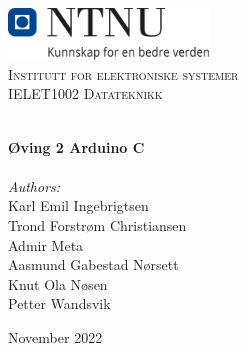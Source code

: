 
\begin{titlepage}
\vbox{ }
\vbox{ }
\begin{center}
\includegraphics[width=0.40\textwidth]{Images/NTNU_logo.png}\\[1cm]
\textsc{\LARGE Institutt for elektroniske systemer}\\[1.5cm]
\textsc{\Large IELET1002 Datateknikk}\\[0.5cm]
\vbox{ }

\HRule \\[0.4cm]
{ \huge \bfseries Øving 2 Arduino C}\\[0.4cm]
\HRule \\[1.5cm]

\large
\emph{Authors:}\\
    Karl Emil Ingebrigtsen\\
    Trond Forstrøm Christiansen\\
    Admir Meta\\
    Aasmund Gabestad Nørsett\\
    Knut Ola Nøsen\\
    Petter Wandsvik



\vfill

{\large November 2022}
\end{center}
\end{titlepage}